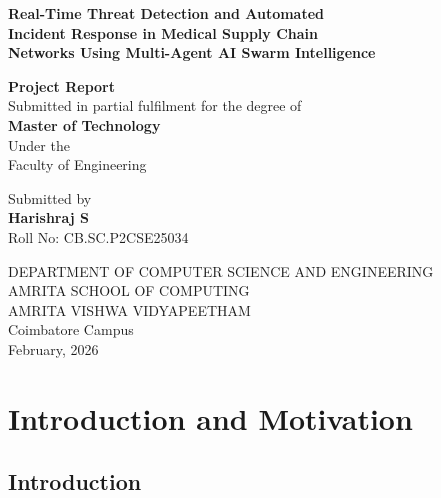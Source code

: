 \documentclass[12pt, a4paper]{report}
\begin{document}
\begin{titlepage}
    \centering
    \vspace*{1cm}

    {\LARGE \textbf{Real-Time Threat Detection and Automated\\[6pt]
    Incident Response in Medical Supply Chain\\[6pt]
    Networks Using Multi-Agent AI Swarm Intelligence}}

    \vspace{1.5cm}
    {\large \textbf{Project Report}}\\[0.3cm]
    {\normalsize Submitted in partial fulfilment for the degree of}\\[0.3cm]
    {\large \textbf{Master of Technology}}\\[0.3cm]
    {\normalsize Under the}\\[0.2cm]
    {\large Faculty of Engineering}

    \vspace{1.5cm}
    {\normalsize Submitted by}\\[0.3cm]
    {\Large \textbf{Harishraj S}}\\[0.2cm]
    {\normalsize Roll No: CB.SC.P2CSE25034}

    \vspace{2cm}
    {\large DEPARTMENT OF COMPUTER SCIENCE AND ENGINEERING}\\[0.3cm]
    {\large AMRITA SCHOOL OF COMPUTING}\\[0.3cm]
    {\large AMRITA VISHWA VIDYAPEETHAM}\\[0.3cm]
    {\normalsize Coimbatore Campus}\\[0.5cm]
    {\normalsize February, 2026}
\end{titlepage}

\tableofcontents
\newpage

\chapter{Introduction and Motivation}

\section{Introduction}
\end{document}
